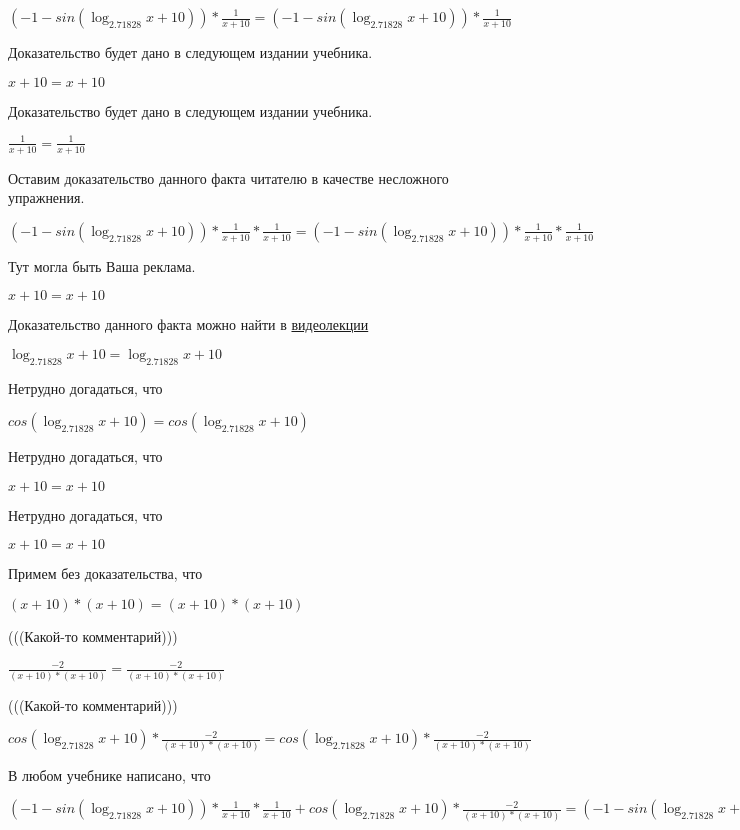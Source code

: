 \documentclass[12pt,a4paper,fleqn]{article}
\theoremstyle{definition}
\begin{document}
$( -1  - sin(\log_{ 2.71828 }{ x  +  10 })) * \frac{ 1 }{ x  +  10 }
 = ( -1  - sin(\log_{ 2.71828 }{ x  +  10 })) * \frac{ 1 }{ x  +  10 }
$

Доказательство будет дано в следующем издании учебника. 

$ x  +  10  =  x  +  10 $

Доказательство будет дано в следующем издании учебника. 

$\frac{ 1 }{ x  +  10 }
 = \frac{ 1 }{ x  +  10 }
$

Оставим доказательство данного факта читателю в качестве несложного упражнения. 

$( -1  - sin(\log_{ 2.71828 }{ x  +  10 })) * \frac{ 1 }{ x  +  10 }
 * \frac{ 1 }{ x  +  10 }
 = ( -1  - sin(\log_{ 2.71828 }{ x  +  10 })) * \frac{ 1 }{ x  +  10 }
 * \frac{ 1 }{ x  +  10 }
$

Тут могла быть Ваша реклама. 

$ x  +  10  =  x  +  10 $

Доказательство данного факта можно найти в \href{https://www.youtube.com/watch?v=dQw4w9WgXcQ}{видеолекции} 

$\log_{ 2.71828 }{ x  +  10 } = \log_{ 2.71828 }{ x  +  10 }$

Нетрудно догадаться, что 

$cos(\log_{ 2.71828 }{ x  +  10 }) = cos(\log_{ 2.71828 }{ x  +  10 })$

Нетрудно догадаться, что 

$ x  +  10  =  x  +  10 $

Нетрудно догадаться, что 

$ x  +  10  =  x  +  10 $

Примем без доказательства, что 

$( x  +  10 ) * ( x  +  10 ) = ( x  +  10 ) * ( x  +  10 )$

(((Какой-то комментарий))) 

$\frac{ -2 }{( x  +  10 ) * ( x  +  10 )}
 = \frac{ -2 }{( x  +  10 ) * ( x  +  10 )}
$

(((Какой-то комментарий))) 

$cos(\log_{ 2.71828 }{ x  +  10 }) * \frac{ -2 }{( x  +  10 ) * ( x  +  10 )}
 = cos(\log_{ 2.71828 }{ x  +  10 }) * \frac{ -2 }{( x  +  10 ) * ( x  +  10 )}
$

В любом учебнике написано, что 

$( -1  - sin(\log_{ 2.71828 }{ x  +  10 })) * \frac{ 1 }{ x  +  10 }
 * \frac{ 1 }{ x  +  10 }
 + cos(\log_{ 2.71828 }{ x  +  10 }) * \frac{ -2 }{( x  +  10 ) * ( x  +  10 )}
 = ( -1  - sin(\log_{ 2.71828 }{ x  +  10 })) * \frac{ 1 }{ x  +  10 }
 * \frac{ 1 }{ x  +  10 }
 + cos(\log_{ 2.71828 }{ x  +  10 }) * \frac{ -2 }{( x  +  10 ) * ( x  +  10 )}
$
\end{document}
